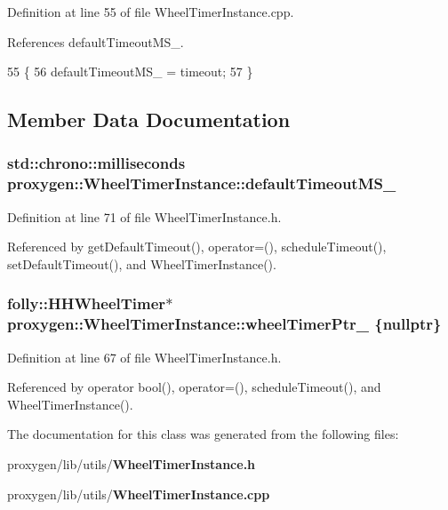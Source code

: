 Definition at line 55 of file Wheel\+Timer\+Instance.\+cpp.



References default\+Timeout\+M\+S\+\_\+.


\begin{DoxyCode}
55                                                                         \{
56   defaultTimeoutMS_ = timeout;
57 \}
\end{DoxyCode}


\subsection{Member Data Documentation}
\subsubsection[{default\+Timeout\+M\+S\+\_\+}]{\setlength{\rightskip}{0pt plus 5cm}std\+::chrono\+::milliseconds proxygen\+::\+Wheel\+Timer\+Instance\+::default\+Timeout\+M\+S\+\_\+\hspace{0.3cm}{\ttfamily [private]}}\label{classproxygen_1_1WheelTimerInstance_a31de0f848b57b2bb520b9163cc9847de}


Definition at line 71 of file Wheel\+Timer\+Instance.\+h.



Referenced by get\+Default\+Timeout(), operator=(), schedule\+Timeout(), set\+Default\+Timeout(), and Wheel\+Timer\+Instance().

\subsubsection[{wheel\+Timer\+Ptr\+\_\+}]{\setlength{\rightskip}{0pt plus 5cm}folly\+::\+H\+H\+Wheel\+Timer$\ast$ proxygen\+::\+Wheel\+Timer\+Instance\+::wheel\+Timer\+Ptr\+\_\+ \{{\bf nullptr}\}\hspace{0.3cm}{\ttfamily [private]}}\label{classproxygen_1_1WheelTimerInstance_a73fdb540f0b08c082ae5f9639419d172}


Definition at line 67 of file Wheel\+Timer\+Instance.\+h.



Referenced by operator bool(), operator=(), schedule\+Timeout(), and Wheel\+Timer\+Instance().



The documentation for this class was generated from the following files\+:\begin{DoxyCompactItemize}
\item 
proxygen/lib/utils/{\bf Wheel\+Timer\+Instance.\+h}\item 
proxygen/lib/utils/{\bf Wheel\+Timer\+Instance.\+cpp}\end{DoxyCompactItemize}

